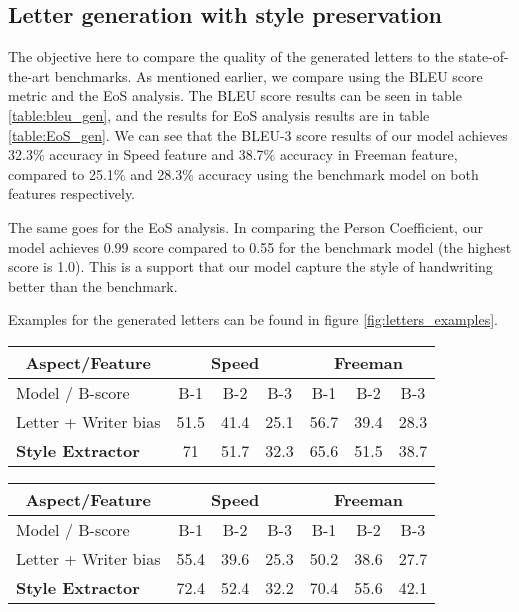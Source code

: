 \documentclass[conference]{IEEEtran}
\begin{document}
\subsection{Letter generation with style preservation}
\par The objective here to compare the quality of the generated letters to the state-of-the-art benchmarks. As mentioned earlier, we compare using the BLEU score metric and the EoS analysis. 
The BLEU score results can be seen in table \ref{table:bleu_gen}, and the results for EoS analysis results are in table \ref{table:EoS_gen}. We can see that the BLEU-3 score results of our model achieves 32.3\% accuracy in Speed feature and 38.7\% accuracy in Freeman feature, compared to 25.1\% and 28.3\% accuracy using the benchmark model on both features respectively.
\par The same goes for the EoS analysis. In comparing the Person Coefficient, our model achieves 0.99 score compared to 0.55 for the benchmark model (the highest score is 1.0). This is a support that our model capture the style of handwriting better than the benchmark. 
\par Examples for the generated letters can be found in figure \ref{fig:letters_examples}.


\begin{table*}[!htbp]
\centering
\begin{tabular}{|l||c|c|c||c|c|c|} 
\hline
\multicolumn{1}{|c||}{Aspect/Feature} & \multicolumn{3}{c||}{ Speed } & \multicolumn{3}{c|}{ Freeman }   \\ \hline
Model / B-score      & B-1  & B-2  & B-3           & B-1  & B-2   & B-3              \\ \hline
Letter + Writer bias & 51.5 & 41.4 & 25.1          & 56.7 & 39.4  & 28.3             \\\hline
\textbf{Style Extractor} & 71 & 51.7 & 32.3 & 65.6 & 51.5 & 38.7 \\\hline
\end{tabular}
\caption{BLEU scores for different models for known writers.}
\label{table:bleu_gen}
\end{table*}

\begin{table*}[!htbp]
\centering
\begin{tabular}{|l||c|c|c||c|c|c|} 
\hline
\multicolumn{1}{|c||}{Aspect/Feature} & \multicolumn{3}{c||}{ Speed } & \multicolumn{3}{c|}{ Freeman }   \\ \hline
Model / B-score      & B-1  & B-2  & B-3           & B-1  & B-2   & B-3              \\ \hline
Letter + Writer bias & 55.4 & 39.6 & 25.3 & 50.2 & 38.6 & 27.7             \\\hline
\textbf{Style Extractor} & 72.4 & 52.4 & 32.2 & 70.4 & 55.6 & 42.1 \\\hline

\end{tabular}
\caption{BLEU scores for different models for style extraction for 30 new writers (style transfer).}
\label{table:bleu_transfer}
\end{table*}
\end{document}
